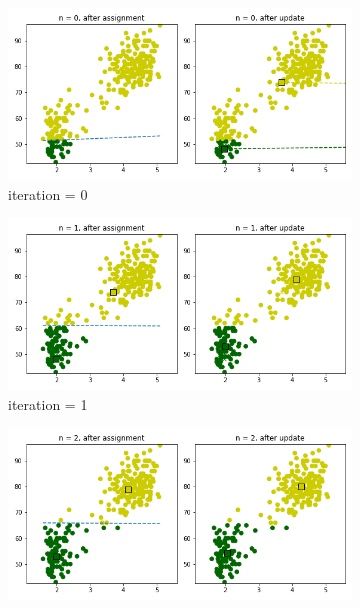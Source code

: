 \documentclass{homework}
\begin{document}
\begin{enumerate}[label=(\alph*)]
		\begin{figure}
		     \centering
		     \begin{subfigure}[b]{0.6\textwidth}
		         \centering
		         \includegraphics[width=\textwidth]{kmeans_visualization_0.png}
		         \caption{iteration = 0}
		     \end{subfigure}
		     \hfill
		     \begin{subfigure}[b]{0.6\textwidth}
		         \centering
		         \includegraphics[width=\textwidth]{kmeans_visualization_1.png}
		         \caption{iteration = 1}
		     \end{subfigure}
		     \hfill
		     \begin{subfigure}[b]{0.6\textwidth}
		         \centering
		         \includegraphics[width=\textwidth]{kmeans_visualization_2.png}

\end{subfigure}
\end{figure}
\end{enumerate}
\end{document}
